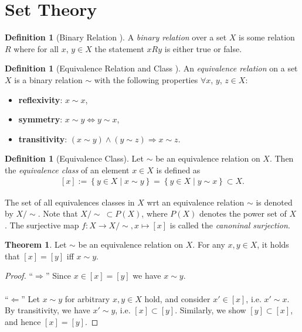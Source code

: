 \documentclass[12pt, a4paper]{article}
\numberwithin{equation}{section}
\theoremstyle{definition}
\theoremstyle{definition}
\newtheorem{defn}[thm]{Definition} %
\newtheorem{theorem}[thm]{Theorem}
\begin{document}
	\newpage 
	\section{Set Theory}
	\begin{defn}[Binary Relation \cite{binary_relations}]
		A \textit{binary relation} over a set $X$ is some relation $R$ where for all $x$, $y\in X$ the statement $xRy$ is either true or false. 
	\end{defn}
	
	\begin{defn}[Equivalence Relation and Class \cite{equivalence_relation}]\label{defn:equivalence_relation}
		An \textit{equivalence relation} on a set $X$ is a binary relation $\sim$ with the following properties $\forall x$, $y$, $z \in X$: 
		\begin{itemize}
			\item \textbf{reflexivity}: $x\sim x$, 
			\item \textbf{symmetry}: $x \sim y\Leftrightarrow y\sim x$, 
			\item  \textbf{transitivity}: $\left(x\sim y\right) \wedge \left(y\sim z\right)\Rightarrow x\sim z$.  
		\end{itemize}
	\end{defn}

	\begin{defn}[Equivalence Class]
		Let $\sim$ be an equivalence relation on $X$. Then the \textit{equivalence class} of an element $x\in X$ is defined as 
		\begin{align}
			\left[x\right] := \left\{y\in X \mid x\sim y \right\} = \left\{ y\in X \mid y\sim x \right\} \subset X. 
		\end{align}
	
		The set of all equivalences classes in $X$ wrt an equivalence relation $\sim$ is denoted by $X/\sim$. Note that $X/\sim\ \subset P(X)$, where $P(X)$ denotes the power set of $X$ \cite{src:quotient_set_X_by_equivalence_relation}. The surjective map $f: X\rightarrow X/\sim, x\mapsto [x]$ is called the \textit{canoninal surjection}.
	\end{defn}

	\begin{theorem}\label{thrm:characterization_equivalence_classes}
		Let $\sim$ be an equivalence relation on $X$. For any $x, y\in X$, it holds that $[x] = [y]$ iff $x\sim y$.
	\end{theorem}
	
	\begin{proof}
		\enquote{$\Longrightarrow$} Since $x\in[x] = [y]$ we have $x\sim y$.
		\\ \\
		\enquote{$\Longleftarrow$} Let $x\sim y$ for arbitrary $x, y\in X$ hold, and consider $x'\in [x]$, i.e. $x'\sim x$. By transitivity, we have $x' \sim y$, i.e. $[x] \subset [y]$. Similarly, we show $[y]\subset [x]$, and hence $[x] = [y]$.
	\end{proof}
\end{document}
